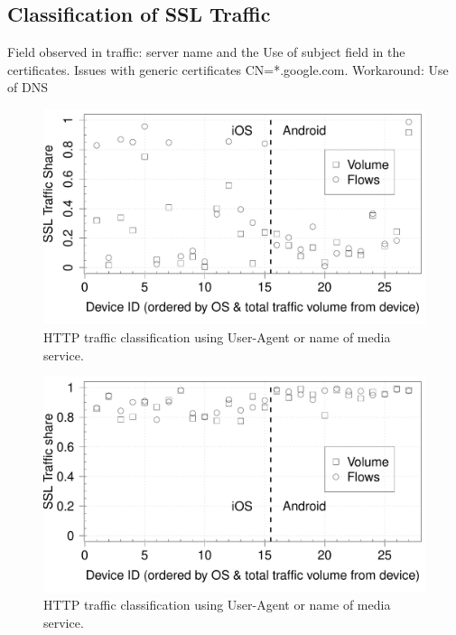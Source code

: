 \subsection{Classification of SSL Traffic}

Field observed in traffic:
server name and the 
Use of subject field in the certificates. 
Issues with generic certificates CN=*.google.com.
Workaround:
Use of DNS

\cite{chen:wifi}


\begin{figure}
\includegraphics[width=\columnwidth]{plots/sslanalysis_someservername_traffic.pdf}
\caption{HTTP traffic classification using User-Agent or name of media service.}
\label{fig:http-classification-app-service}
\end{figure}


\begin{figure}
\includegraphics[width=\columnwidth]{plots/sslanalysis_samedns_traffic.pdf}
\caption{HTTP traffic classification using User-Agent or name of media service.}
\label{fig:http-classification-app-service}
\end{figure}



